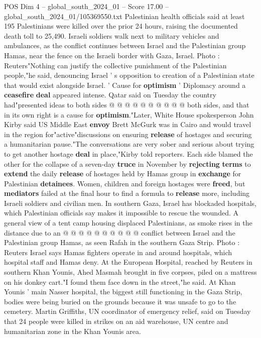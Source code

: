 \begin{textsample}{POS Dim 4 – global\_south\_2024\_01 – Score 17.00 – global\_south\_2024\_01/105369550.txt}
Palestinian health officials said at least 195 Palestinians were killed over the prior 24 hours, raising the documented death toll to 25,490.
Israeli soldiers walk next to military vehicles and ambulances, as the conflict continues between Israel and the Palestinian group Hamas, near the fence on the Israeli border with Gaza, Israel.
Photo : Reuters"Nothing can justify the collective punishment of the Palestinian people,"he said, denouncing Israel ' s opposition to creation of a Palestinian state that would exist alongside Israel. ' Cause for \textbf{optimism} ' Diplomacy around a \textbf{ceasefire} \textbf{deal} appeared intense.
Qatar said on Tuesday the country had"presented ideas to both sides @ @ @ @ @ @ @ @ @ @ both sides, and that in its own right is a cause for \textbf{optimism}."Later, White House spokesperson John Kirby said US Middle East \textbf{envoy} Brett McGurk was in Cairo and would travel in the region for"active"discussions on ensuring \textbf{release} of hostages and securing a humanitarian pause."The conversations are very sober and serious about trying to get another hostage \textbf{deal} in place,"Kirby told reporters.
Each side blamed the other for the collapse of a seven-day \textbf{truce} in November by \textbf{rejecting} \textbf{terms} to \textbf{extend} the daily \textbf{release} of hostages held by Hamas group in \textbf{exchange} for Palestinian \textbf{detainees}.
Women, children and foreign hostages were \textbf{freed}, but \textbf{mediators} failed at the final hour to find a formula to \textbf{release} more, including Israeli soldiers and civilian men.
In southern Gaza, Israel has blockaded hospitals, which Palestinian officials say makes it impossible to rescue the wounded.
A general view of a tent camp housing displaced Palestinians, as smoke rises in the distance due to an @ @ @ @ @ @ @ @ @ @ conflict between Israel and the Palestinian group Hamas, as seen Rafah in the southern Gaza Strip.
Photo : Reuters Israel says Hamas fighters operate in and around hospitals, which hospital staff and Hamas deny.
At the European Hospital, reached by Reuters in southern Khan Younis, Ahed Masmah brought in five corpses, piled on a mattress on his donkey cart."I found them face down in the street,"he said.
At Khan Younis ' main Nasser hospital, the biggest still functioning in the Gaza Strip, bodies were being buried on the grounds because it was unsafe to go to the cemetery.
Martin Griffiths, UN coordinator of emergency relief, said on Tuesday that 24 people were killed in strikes on an aid warehouse, UN centre and humanitarian zone in the Khan Younis area.

\end{textsample}
